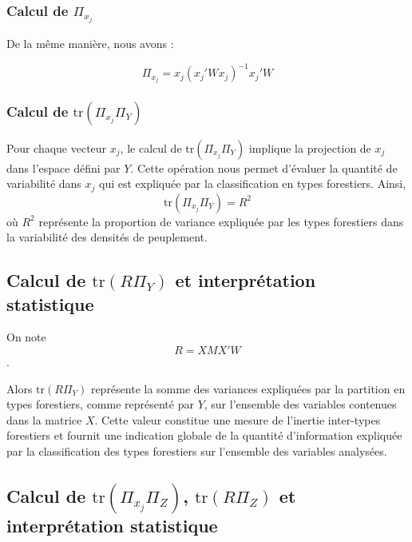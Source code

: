 \documentclass[
]{article}
\begin{document}
\hypertarget{calcul-de-pi_x_j}{%
\subsubsection{\texorpdfstring{Calcul de
\(\Pi_{x_j}\)}{Calcul de \textbackslash Pi\_\{x\_j\}}}\label{calcul-de-pi_x_j}}

De la même manière, nous avons :

\[
   \Pi_{x_j} = {x_j} \left( {x_j}' W {x_j} \right)^{-1} {x_j}' W
   \]

\hypertarget{calcul-de-texttrpi_x_j-pi_y}{%
\subsubsection{\texorpdfstring{Calcul de
\(\text{tr}(\Pi_{x_j} \Pi_Y)\)}{Calcul de \textbackslash text\{tr\}(\textbackslash Pi\_\{x\_j\} \textbackslash Pi\_Y)}}\label{calcul-de-texttrpi_x_j-pi_y}}

Pour chaque vecteur \(x_j\), le calcul de \(\text{tr}(\Pi_{x_j} \Pi_Y)\)
implique la projection de \(x_j\) dans l'espace défini par \(Y\). Cette
opération nous permet d'évaluer la quantité de variabilité dans \(x_j\)
qui est expliquée par la classification en types forestiers.
Ainsi,\[ \text{tr}(\Pi_{x_j} \Pi_Y) = R^2 \] où \(R^2\) représente la
proportion de variance expliquée par les types forestiers dans la
variabilité des densités de peuplement.

\hypertarget{calcul-de-texttrr-pi_y-et-interpruxe9tation-statistique}{%
\subsection{\texorpdfstring{Calcul de \(\text{tr}(R \Pi_Y)\) et
interprétation
statistique}{Calcul de \textbackslash text\{tr\}(R \textbackslash Pi\_Y) et interprétation statistique}}\label{calcul-de-texttrr-pi_y-et-interpruxe9tation-statistique}}

On note \[ R = X M X' W \].

Alors \(\text{tr}(R \Pi_Y)\) représente la somme des variances
expliquées par la partition en types forestiers, comme représenté par
\(Y\), sur l'ensemble des variables contenues dans la matrice \(X\).
Cette valeur constitue une mesure de l'inertie inter-types forestiers et
fournit une indication globale de la quantité d'information expliquée
par la classification des types forestiers sur l'ensemble des variables
analysées.

\hypertarget{calcul-de-texttrpi_x_j-pi_z-texttrr-pi_z-et-interpruxe9tation-statistique}{%
\subsection{\texorpdfstring{Calcul de \(\text{tr}(\Pi_{x_j} \Pi_Z)\),
\(\text{tr}(R \Pi_Z)\) et interprétation
statistique}{Calcul de \textbackslash text\{tr\}(\textbackslash Pi\_\{x\_j\} \textbackslash Pi\_Z), \textbackslash text\{tr\}(R \textbackslash Pi\_Z) et interprétation statistique}}\label{calcul-de-texttrpi_x_j-pi_z-texttrr-pi_z-et-interpruxe9tation-statistique}}
\end{document}
